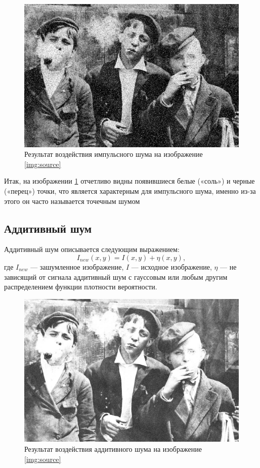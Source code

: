 \begin{figure}[ht!!]
    \centering
    \includegraphics[width=\textwidth]{../Noisy_images/Impulse_noise.jpg}
    \caption{Результат воздействия импульсного шума на изображение \ref{img:source}}
    \label{img:impulse_noise}  
\end{figure}
\FloatBarrier

Итак, на изображении \ref{img:impulse_noise} отчетливо видны появившиеся белые («соль») и черные («перец») точки, что является характерным для импульсного шума, именно из-за этого он часто называется точечным шумом

\subsection{Аддитивный шум}
Аддитивный шум описывается следующим выражением:
\begin{equation}
    I_{new}(x,y) = I(x,y)  + \eta(x,y),
\end{equation}
где $ I_{new}$ — зашумленное изображение, $I$ — исходное изображение, $\eta$ — не зависящий от сигнала аддитивный шум с гауссовым или любым другим распределением функции плотности вероятности.

\begin{figure}[ht!!]
    \centering
    \includegraphics[width=\textwidth]{../Noisy_images/Additive_noise.jpg}
    \caption{Результат воздействия аддитивного шума на изображение \ref{img:source}}
    \label{img:additive_noise}
\end{figure}
\FloatBarrier

